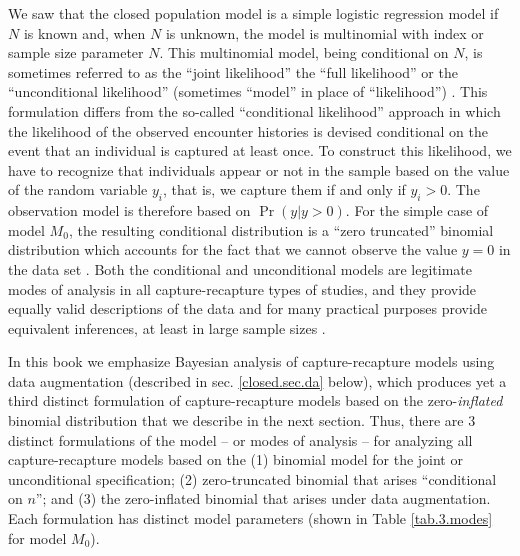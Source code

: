 We saw that the closed population model is a simple logistic
regression model if $N$ is known and, when $N$ is unknown, the model
is multinomial with index or sample size parameter $N$. This
multinomial model, being conditional on $N$, is sometimes referred to
as the ``joint likelihood'' the ``full likelihood'' or the
``unconditional likelihood'' (sometimes
``model'' in place of ``likelihood'')
\citep{sanathanan:1972,borchers_etal:2002}. This
formulation differs from the so-called ``conditional likelihood''
approach in which the likelihood of the observed encounter histories
is devised conditional on the event that an individual is captured at
least once.  To construct this likelihood, we have to recognize that
individuals appear or not in the sample based on the value of the
random variable $y_{i}$, that is, we capture them if and only if
$y_{i}>0$.  The observation model is therefore based on $\Pr(y|y>0)$.
For the simple case of model $M_0$, the resulting conditional
distribution is a ``zero truncated'' binomial distribution which
accounts for the fact that we cannot observe the value $y=0$ in the
data set \citep[see][sec. 5.1]{royle_dorazio:2008}.  Both the
conditional and unconditional models are legitimate modes of analysis
in all capture-recapture types of studies, and they provide equally
valid descriptions of the data and for many practical purposes provide
equivalent inferences, at least in large sample sizes
\citep{sanathanan:1972}.

In this book we emphasize Bayesian analysis of capture-recapture
models using data augmentation
(described in sec. \ref{closed.sec.da} below), which
produces yet a third distinct formulation of capture-recapture models
based on the zero-{\it inflated} binomial distribution that we
describe in the next section.  Thus, there are 3 distinct formulations
of the model -- or modes of analysis -- for analyzing all
capture-recapture models based on the (1) binomial model for the joint
or unconditional specification; (2) zero-truncated binomial that
arises ``conditional on $n$''; and (3) the zero-inflated binomial that
arises under data augmentation.  Each formulation has distinct
model parameters (shown in Table \ref{tab.3.modes} for
model $M_0$).


